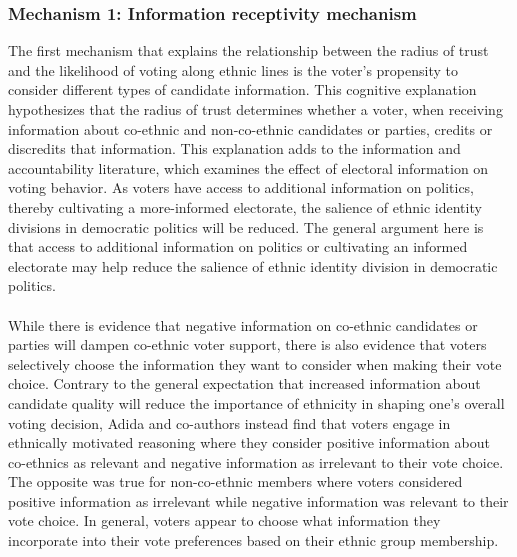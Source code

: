 \documentclass[a4paper, 12pt]{article}
\begin{document}
\subsubsection{Mechanism 1: Information receptivity mechanism}
The first mechanism that explains the relationship between the radius of trust and the likelihood of voting along ethnic lines is the voter’s propensity to consider different types of candidate information. This cognitive explanation hypothesizes that the radius of trust determines whether a voter, when receiving information about co-ethnic and non-co-ethnic candidates or parties, credits or discredits that information.  This explanation adds to the information and accountability literature, which examines the effect of electoral information on voting behavior. As voters have access to additional information on politics, thereby cultivating a more-informed electorate, the salience of ethnic identity divisions in democratic politics will be reduced. The general argument here is that access to additional information on politics or cultivating an informed electorate may help reduce the salience of ethnic identity division in democratic politics.
\paragraph{}
While there is evidence that negative information on co-ethnic candidates or parties will dampen co-ethnic voter support\cite{conroy-krutzInformationEthnicPolitics2013}, there is also evidence that voters selectively choose the information they want to consider when making their vote choice\cite{adidaReducingReinforcingInGroup2017}. Contrary to the general expectation that increased information about candidate quality will reduce the importance of ethnicity in shaping one’s overall voting decision, Adida and co-authors instead find that voters engage in ethnically motivated reasoning where they consider positive information about co-ethnics as relevant and negative information as irrelevant to their vote choice. The opposite was true for non-co-ethnic members where voters considered positive information as irrelevant while negative information was relevant to their vote choice. In general, voters appear to choose what information they incorporate into their vote preferences based on their ethnic group membership.
\end{document}
